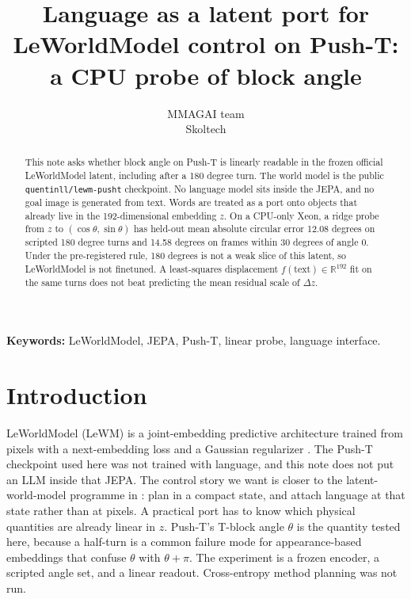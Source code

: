 \documentclass[11pt,a4paper]{article}
\title{Language as a latent port for LeWorldModel control on Push-T: a CPU probe of block angle}
\author{MMAGAI team\\Skoltech}
\date{}
\begin{document}
\maketitle

\begin{abstract}
This note asks whether block angle on Push-T is linearly readable in the frozen official LeWorldModel latent, including after a 180 degree turn.
The world model is the public \texttt{quentinll/lewm-pusht} checkpoint.
No language model sits inside the JEPA, and no goal image is generated from text.
Words are treated as a port onto objects that already live in the 192-dimensional embedding $z$.
On a CPU-only Xeon, a ridge probe from $z$ to $(\cos\theta,\sin\theta)$ has held-out mean absolute circular error 12.08 degrees on scripted 180 degree turns and 14.58 degrees on frames within 30 degrees of angle 0.
Under the pre-registered rule, 180 degrees is not a weak slice of this latent, so LeWorldModel is not finetuned.
A least-squares displacement $f(\mathrm{text})\in\mathbb{R}^{192}$ fit on the same turns does not beat predicting the mean residual scale of $\Delta z$.
\end{abstract}

\noindent\textbf{Keywords:}
LeWorldModel, JEPA, Push-T, linear probe, language interface.

\section{Introduction}
\label{sec:intro}
LeWorldModel (LeWM) is a joint-embedding predictive architecture trained from pixels with a next-embedding loss and a Gaussian regularizer \citep{maes2026lewm}.
The Push-T checkpoint used here was not trained with language, and this note does not put an LLM inside that JEPA.
The control story we want is closer to the latent-world-model programme in \citet{lecun2022path}: plan in a compact state, and attach language at that state rather than at pixels.
A practical port has to know which physical quantities are already linear in $z$.
Push-T's T-block angle $\theta$ is the quantity tested here, because a half-turn is a common failure mode for appearance-based embeddings that confuse $\theta$ with $\theta+\pi$.
The experiment is a frozen encoder, a scripted angle set, and a linear readout.
Cross-entropy method planning was not run.
\end{document}

